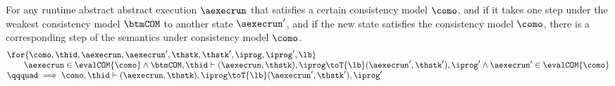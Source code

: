 \begin{thm}
For any runtime abstract abstract execution \( \aexecrun \) that satisfies a certain consistency model \( \como \), and if it takes one step under the weakest consistency model \( \btmCOM \) to another state \( \aexecrun' \), and if the new state satisfies the consistency model \( \como \), there is a corresponding step of the semantics under consistency model \( \como \).
 \[
 \begin{array}{@{}l@{}}
    \for{\como, \thid, \aexecrun, \aexecrun', \thstk, \thstk', \iprog, {\iprog}', \lb} \\
    \qquad \aexecrun \in \evalCOM{\como}
    \land \btmCOM, \thid \vdash (\aexecrun, \thstk), \iprog \toT{\lb} (\aexecrun', \thstk'), {\iprog}' \land \aexecrun' \in \evalCOM{\como} \\
    \qqquad \implies \como, \thid \vdash (\aexecrun, \thstk), \iprog \toT{\lb} (\aexecrun', \thstk'), {\iprog}' 
 \end{array}
 \]
\end{thm}

